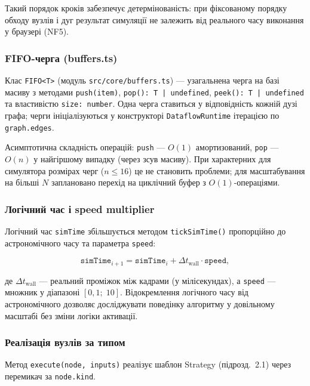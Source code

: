 Такий порядок кроків забезпечує детермінованість: при фіксованому
порядку обходу вузлів і дуг результат симуляції не залежить від
реального часу виконання у браузері (NF5).

\subsubsection*{FIFO-черга (buffers.ts)}

Клас \texttt{FIFO<T>} (модуль \texttt{src/core/buffers.ts}) ---
узагальнена черга на базі масиву з методами \texttt{push(item)},
\texttt{pop(): T | undefined}, \texttt{peek(): T | undefined} та
властивістю \texttt{size: number}. Одна черга ставиться у
відповідність кожній дузі графа; черги ініціалізуються у конструкторі
\texttt{DataflowRuntime} ітерацією по \texttt{graph.edges}.

Асимптотична складність операцій: \texttt{push} --- $O(1)$
амортизований, \texttt{pop} --- $O(n)$ у найгіршому випадку (через
зсув масиву). При характерних для симулятора розмірах черг
($n \le 16$) це не становить проблеми; для масштабування на більші
$N$ заплановано перехід на циклічний буфер з $O(1)$-операціями.

\subsubsection*{Логічний час і speed multiplier}

Логічний час \texttt{simTime} збільшується методом
\texttt{tickSimTime()} пропорційно до астрономічного часу та
параметра \texttt{speed}:

\begin{equation}
  \texttt{simTime}_{i+1} = \texttt{simTime}_{i} +
    \Delta t_{\text{wall}} \cdot \texttt{speed},
  \label{eq:simtime}
\end{equation}

де $\Delta t_{\text{wall}}$ --- реальний проміжок між кадрами
(у мілісекундах), а \texttt{speed} --- множник у діапазоні
$[0{,}1;\; 10]$. Відокремлення логічного часу від астрономічного
дозволяє досліджувати поведінку алгоритму у довільному
масштабі без зміни логіки активації.

\subsubsection*{Реалізація вузлів за типом}

Метод \texttt{execute(node, inputs)} реалізує шаблон Strategy
(підрозд.~2.1) через перемикач за \texttt{node.kind}.

